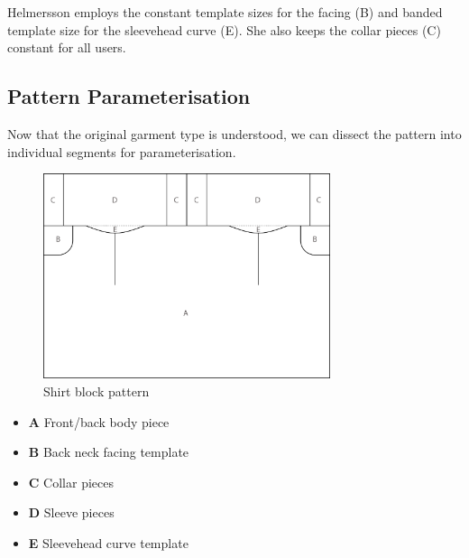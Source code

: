 Helmersson employs the constant template sizes for the facing (B) and banded template size for the sleevehead curve (E). She also keeps the collar pieces (C) constant for all users.


\subsection{Pattern Parameterisation}
Now that the original garment type is understood, we can dissect the pattern into individual segments for parameterisation.
\begin{figure} [H] %
    \centering %
    \includegraphics[width = 0.75\textwidth]{Images/originalpattern_whole.png} %
    \caption{Shirt block pattern}
\end{figure}

\begin{itemize}
    \item \textbf{A} Front/back body piece
    \item \textbf{B} Back neck facing template
    \item \textbf{C} Collar pieces
    \item \textbf{D} Sleeve pieces
    \item \textbf{E} Sleevehead curve template
\end{itemize}


